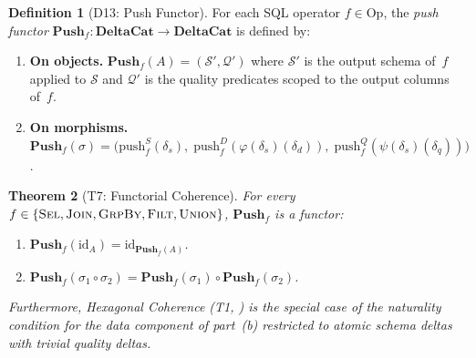 \documentclass[11pt,a4paper]{article}
\newtheorem{theorem}{Theorem}[section]
\theoremstyle{definition}
\newtheorem{definition}[theorem]{Definition}
\newcommand{\push}{\mathrm{push}}
\newcommand{\Op}{\mathrm{Op}}
\begin{document}
\begin{definition}[D13: Push Functor]\label{def:push-functor}
For each SQL operator $f \in \Op$, the \emph{push functor}
$\mathbf{Push}_f \colon \mathbf{DeltaCat} \to \mathbf{DeltaCat}$ is defined by:
\begin{enumerate}[nosep]
  \item \textbf{On objects.}  $\mathbf{Push}_f(A) = (\mathcal{S}',
    \mathcal{Q}')$ where $\mathcal{S}'$ is the output schema of~$f$ applied to
    $\mathcal{S}$ and $\mathcal{Q}'$ is the quality predicates scoped to the
    output columns of~$f$.
  \item \textbf{On morphisms.}
    $\mathbf{Push}_f(\sigma) =
    \bigl(\push_f^S(\delta_s),\;
          \push_f^D(\varphi(\delta_s)(\delta_d)),\;
          \push_f^Q(\psi(\delta_s)(\delta_q))\bigr)$.
\end{enumerate}
\end{definition}

\begin{theorem}[T7: Functorial Coherence]\label{thm:functorial}
For every $f \in \{\textsc{Sel}, \textsc{Join}, \textsc{GrpBy}, \textsc{Filt},
\textsc{Union}\}$, $\mathbf{Push}_f$ is a functor:
\begin{enumerate}[label=(\alph*)]
  \item $\mathbf{Push}_f(\mathrm{id}_A) = \mathrm{id}_{\mathbf{Push}_f(A)}$.
  \item $\mathbf{Push}_f(\sigma_1 \circ \sigma_2)
    = \mathbf{Push}_f(\sigma_1) \circ \mathbf{Push}_f(\sigma_2)$.
\end{enumerate}
Furthermore, Hexagonal Coherence (T1, ) is the special case
of the naturality condition for the data component of part~(b) restricted to
atomic schema deltas with trivial quality deltas.
\end{theorem}
\end{document}
